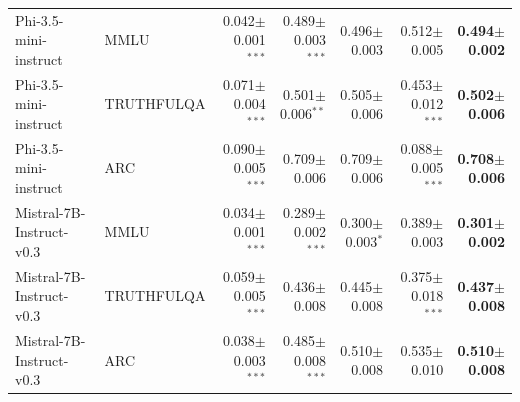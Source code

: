 \begin{table}[t]
\begin{tabular}{llrrrrr}
\midrule
Phi-3.5-mini-instruct & MMLU & 0.042{\small$\pm$0.001}$^{***}$ & 0.489{\small$\pm$0.003}$^{***}$ & 0.496{\small$\pm$0.003} & 0.512{\small$\pm$0.005} & \textbf{0.494{\small$\pm$0.002}} \\
Phi-3.5-mini-instruct & TRUTHFULQA & 0.071{\small$\pm$0.004}$^{***}$ & 0.501{\small$\pm$0.006}$^{**}$ & 0.505{\small$\pm$0.006} & 0.453{\small$\pm$0.012}$^{***}$ & \textbf{0.502{\small$\pm$0.006}} \\
Phi-3.5-mini-instruct & ARC & 0.090{\small$\pm$0.005}$^{***}$ & 0.709{\small$\pm$0.006} & 0.709{\small$\pm$0.006} & 0.088{\small$\pm$0.005}$^{***}$ & \textbf{0.708{\small$\pm$0.006}} \\
\midrule
Mistral-7B-Instruct-v0.3 & MMLU & 0.034{\small$\pm$0.001}$^{***}$ & 0.289{\small$\pm$0.002}$^{***}$ & 0.300{\small$\pm$0.003}$^{*}$ & 0.389{\small$\pm$0.003} & \textbf{0.301{\small$\pm$0.002}} \\
Mistral-7B-Instruct-v0.3 & TRUTHFULQA & 0.059{\small$\pm$0.005}$^{***}$ & 0.436{\small$\pm$0.008} & 0.445{\small$\pm$0.008} & 0.375{\small$\pm$0.018}$^{***}$ & \textbf{0.437{\small$\pm$0.008}} \\
Mistral-7B-Instruct-v0.3 & ARC & 0.038{\small$\pm$0.003}$^{***}$ & 0.485{\small$\pm$0.008}$^{***}$ & 0.510{\small$\pm$0.008} & 0.535{\small$\pm$0.010} & \textbf{0.510{\small$\pm$0.008}} \\
\bottomrule
\end{tabular}
\end{table}
